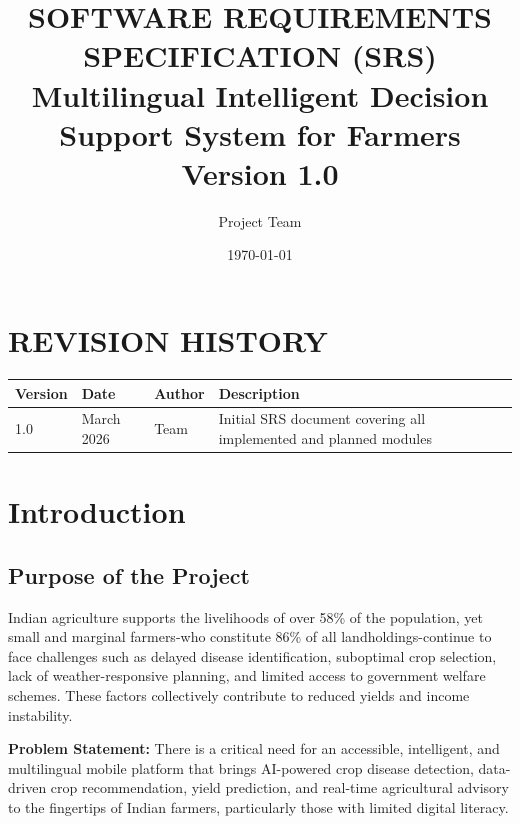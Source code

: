 \documentclass[12pt,a4paper]{article}
\title{
    \vspace{-1cm}
    {\fontsize{14}{16}\selectfont\bfseries SOFTWARE REQUIREMENTS SPECIFICATION (SRS)}\\[0.3cm]
    {\fontsize{14}{16}\selectfont Multilingual Intelligent Decision Support System for Farmers}\\[0.2cm]
    {\fontsize{12}{14}\selectfont Version 1.0}
}
\author{Project Team}
\date{\today}
\newcommand{\tablefont}{\fontsize{10}{12}\selectfont}
\begin{document}
\justifying
\maketitle
\thispagestyle{empty}
\newpage

\tableofcontents
\newpage

\section*{REVISION HISTORY}

{\tablefont
\begin{tabular}{|l|l|l|p{7cm}|}
\hline
\textbf{Version} & \textbf{Date} & \textbf{Author} & \textbf{Description} \\
\hline
1.0 & March 2026 & Team & Initial SRS document covering all implemented and planned modules \\
\hline
\end{tabular}
}

\newpage

\section{Introduction}

\subsection{Purpose of the Project}

Indian agriculture supports the livelihoods of over 58\% of the population, yet small and marginal farmers-who constitute 86\% of all landholdings-continue to face challenges such as delayed disease identification, suboptimal crop selection, lack of weather-responsive planning, and limited access to government welfare schemes. These factors collectively contribute to reduced yields and income instability.

\textbf{Problem Statement:} There is a critical need for an accessible, intelligent, and multilingual mobile platform that brings AI-powered crop disease detection, data-driven crop recommendation, yield prediction, and real-time agricultural advisory to the fingertips of Indian farmers, particularly those with limited digital literacy.
\end{document}

